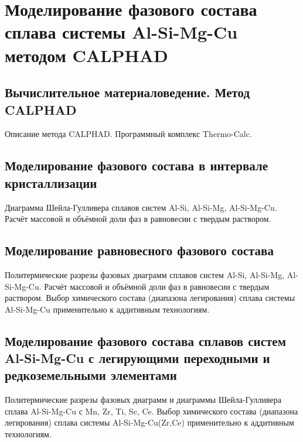 \chapter{Моделирование фазового состава сплава системы Al-Si-Mg-Cu методом CALPHAD}\label{ch:chapter2}

\section{Вычислительное материаловедение. Метод CALPHAD}\label{sec:chapter2/section1}

Описание метода CALPHAD. Программный комплекс Thermo-Calc.

\section{Моделирование фазового состава в интервале кристаллизации}\label{sec:chapter2/section2}

Диаграмма Шейла-Гулливера сплавов систем Al-Si, Al-Si-Mg, Al-Si-Mg-Cu. Расчёт массовой и объёмной доли фаз в равновесии с твердым раствором.

\section{Моделирование равновесного фазового состава}\label{sec:chapter2/section3}

Политермические разрезы фазовых диаграмм сплавов систем Al-Si, Al-Si-Mg, Al-Si-Mg-Cu. Расчёт массовой и объёмной доли фаз в равновесии с твердым раствором. Выбор химического состава (диапазона легирования) сплава системы Al-Si-Mg-Cu применительно к аддитивным технологиям.

\section{Моделирование фазового состава сплавов систем Al-Si-Mg-Cu с легирующими переходными и редкоземельными элементами}\label{sec:chapter2/section4}

Политермические разрезы фазовых диаграмм и диаграммы Шейла-Гулливера сплава Al-Si-Mg-Cu с Mn, Zr, Ti, Sc, Ce. Выбор химического состава (диапазона легирования) сплава системы Al-Si-Mg-Cu(Zr,Ce) применительно к аддитивным технологиям.